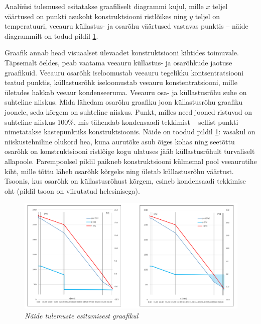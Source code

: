 Analüüsi tulemused esitatakse graafiliselt diagrammi kujul, mille \begin{math}x\end{math} teljel väärtused on 
punkti asukoht konstruktsiooni ristlõikes ning \begin{math}y\end{math} teljel on temperatuuri, veeauru küllastus- ja
osarõhu väärtused vastavas punktis -- näide diagrammilt on todud pildil  \ref{fig:excel_graph_sample}.

Graafik annab head visuaalset ülevaadet konstruktsiooni kihtides toimuvale. Täpsemalt öeldes, peab vaatama 
veeauru küllastus- ja osarõhkude jaotuse graafikuid. Veeauru osarõhk iseloomustab veeauru tegelikku kontsentratsiooni
teatud punktis, küllastusrõhk iseloomustab veeauru konstentratsiooni, mille ületades hakkab veeaur kondenseeruma.
Veeauru osa- ja küllastusrõhu suhe on suhteline niiskus. Mida lähedam osarõhu graafiku joon küllastusrõhu graafiku 
joonele, seda kõrgem on suhteline niiskus. Punkt, milles need jooned ristuvad on suhteline niiskus 100\%, mis 
tähendab kondensaadi tekkimist -- sellist punkti nimetatakse kastepunktiks konstruktsioonis.
Näide on toodud pildil \ref{fig:excel_graph_sample}: vasakul on niiskustehniline olukord hea, kuna aurutõke asub õiges 
kohas ning seetõttu osarõhk on konstruktsiooni ristlõige kogu ulatuses jääb küllastusrõhult turvaliselt allapoole.
Parempoolsel pildil paikneb konstruktsiooni külmemal pool veeaurutihe kiht, mille tõttu läheb osarõhk kõrgeks ning 
ületab küllastusrõhu väärtust. Tsoonis, kus osarõhk on küllastusrõhust kõrgem, esineb kondensaadi tekkimise oht (pildil
tsoon on viirutatud helesinisega).

\begin{figure}[ht]
    \centering
    \includegraphics[width=.8\textwidth]{figures/problem_statement/05_excel_grafic_sample.png}
    \caption[Näide niiskustehnilise analüüsi tulemuste esitamisest graafikul]{\textit{Näide tulemuste esitamisest graafikul}}
    \label{fig:excel_graph_sample}
\end{figure}


